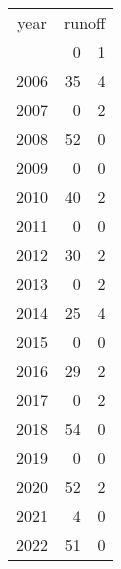 \footnotesize\begin{tabular}[t]{lrr}
\toprule
\multicolumn{1}{c}{year} & \multicolumn{2}{c}{runoff} \\
\cmidrule(l{3pt}r{3pt}){1-1} \cmidrule(l{3pt}r{3pt}){2-3}
  & 0 & 1\\
\midrule
2006 & 35 & 4\\
2007 & 0 & 2\\
2008 & 52 & 0\\
2009 & 0 & 0\\
2010 & 40 & 2\\
2011 & 0 & 0\\
2012 & 30 & 2\\
2013 & 0 & 2\\
2014 & 25 & 4\\
2015 & 0 & 0\\
2016 & 29 & 2\\
2017 & 0 & 2\\
2018 & 54 & 0\\
2019 & 0 & 0\\
2020 & 52 & 2\\
2021 & 4 & 0\\
2022 & 51 & 0\\
\bottomrule
\end{tabular}
